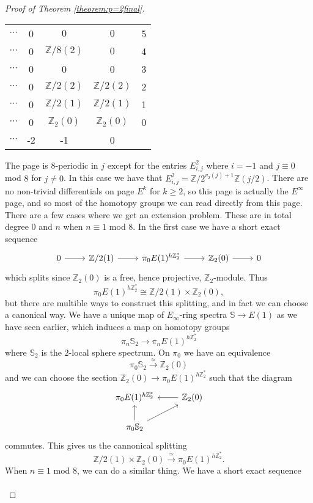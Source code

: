 \documentclass[a4paper]{article} %
\theoremstyle{definition}
\newcommand{\toWithMapLong}[1]{\overset{#1}{\longrightarrow}}
\newcommand{\Z}{\mathbb{Z}}
\newcommand{\Sph}{\mathbb{S}}
\begin{document}
\begin{proof}[Proof of Theorem \ref{theorem:p=2final}]
\begin{table}[H]
\begin{tabular}{cccc|c}
    $\cdots$        &   0 &  $0$  & $0$  & 5 \\
      $\cdots$        &   0 &  $\Z/8 (2)$  & $0$  & 4 \\
      $\cdots$        &   0 &  0  &  0 & 3 \\
      $\cdots$        &  0  &  $\Z/2(2)$  &  $\Z/2(2)$ & 2 \\
      $\cdots$       &  0  &  $\Z/2(1)$  & $\Z/2(1)$  & 1 \\
      $\cdots$       &  0  & $\Z_2(0)$ &  $\Z_2(0)$  & 0 \\ \hline
  $\cdots$  & -2 & -1 & 0 &
  \end{tabular}
  \end{table}
  \noindent The page is $8$-periodic in $j$ except for the entries $E^2_{i,j}$ where $i = -1$ and $j \equiv 0$ mod $8$ for $j \neq 0$. In this case we have that $E^2_{i,j} = \Z/2^{v_2(j)+1}\Z(j/2)$. There are no non-trivial differentials on page $E^k$ for $k \ge 2$, so this page is actually the $E^\infty$ page, and so most of the homotopy groups we can read directly from this page. There are a few cases where we get an extension problem. These are in total degree $0$ and $n$ when $n \equiv 1$ mod $8$. In the first case we have a short exact sequence
  \[
  \begin{tikzcd}
    0 \rar & \Z/2(1) \rar & \pi_0E(1)^{h\Z_2^*} \rar & \Z_2(0) \rar & 0
  \end{tikzcd}
  \]
  which splits since $\Z_2(0)$ is a free, hence projective, $\Z_2$-module. Thus
  \[
  \pi_0E(1)^{h\Z_2^*} \cong \Z/2(1) \times \Z_2(0),
  \]
  but there are multible ways to construct this splitting, and in fact we can choose a canonical way. We have a unique map of $E_\infty$-ring spectra $\Sph \to E(1)$ as we have seen earlier, which induces a map on homotopy groups
  \[
  \pi_n \Sph_2 \to \pi_nE(1)^{h\Z_2^*}
  \]
  where $\Sph_2$ is the $2$-local sphere spectrum. On $\pi_0$ we have an equivalence
  \[
  \pi_0\Sph_2 \toWithMapLong{\simeq} \Z_2(0)
  \]
  and we can choose the section $\Z_2(0) \to \pi_0 E(1)^{h\Z_2^*}$ such that the diagram
  \[
  \begin{tikzcd}
    \pi_0E(1)^{h\Z_2^*} & \Z_2(0) \lar \\
    \pi_0 \Sph_2 \arrow{u} \arrow{ur} &
  \end{tikzcd}
  \]
  commutes. This gives us the cannonical splitting
  \[
  \Z/2(1) \times \Z_2(0) \toWithMapLong{\simeq} \pi_0E(1)^{h\Z_2^*}.
  \]
  When $n \equiv 1$ mod $8$, we can do a similar thing. We have a short exact sequence
  \[
  \begin{tikzcd}

\end{tikzcd}\]
\end{proof}
\end{document}
